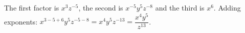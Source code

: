 The first factor is $x^{3}z^{-5}$, the second is $x^{-5}y^{5}z^{-8}$ and the third is $x^6$. Adding exponents: $x^{3-5+6}y^5z^{-5-8}=x^4y^5z^{-13}=\boxed{\dfrac{x^4y^5}{z^{13}}}$.
